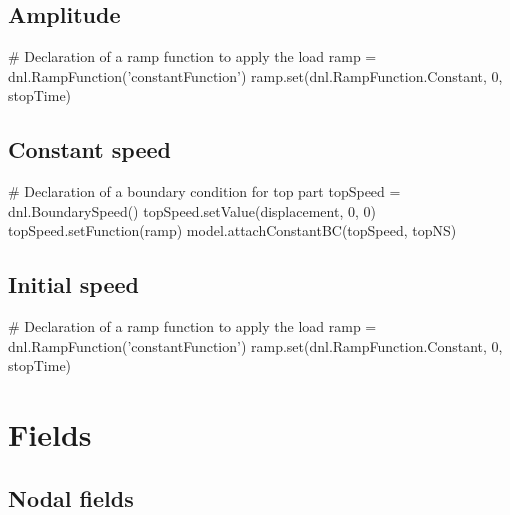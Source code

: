 \subsection{Amplitude}

\begin{PythonListing}
# Declaration of a ramp function to apply the load
ramp = dnl.RampFunction('constantFunction')
ramp.set(dnl.RampFunction.Constant, 0, stopTime)
\end{PythonListing}

\subsection{Constant speed}

\begin{PythonListing}
# Declaration of a boundary condition for top part
topSpeed = dnl.BoundarySpeed()
topSpeed.setValue(displacement, 0, 0)
topSpeed.setFunction(ramp)
model.attachConstantBC(topSpeed, topNS)
\end{PythonListing}

\subsection{Initial speed}

\begin{PythonListing}
# Declaration of a ramp function to apply the load
ramp = dnl.RampFunction('constantFunction')
ramp.set(dnl.RampFunction.Constant, 0, stopTime)
\end{PythonListing}

\section{Fields}\label{ProgrammingLanguage:Section:Fields}

\subsection{Nodal fields}


